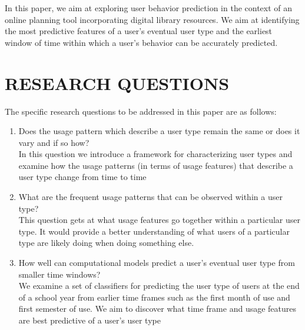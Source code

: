 \documentclass{acm_proc_article-sp}
\begin{document}
In this paper, we aim at exploring user behavior prediction in the context of an online planning tool incorporating digital library resources. We aim at identifying the most predictive features of a user's eventual user type and the earliest window of time within which a user's behavior can be accurately predicted.

\section{RESEARCH QUESTIONS}
The specific research questions to be addressed in this paper are as follows:
\begin{enumerate}
\item Does the usage pattern which describe a user type remain the same or does it vary and if so how?
\\In this question we introduce a framework for characterizing user types and examine how the usage patterns (in terms of usage features) that describe a user type change from time to time
\item What are the frequent usage patterns that can be observed within a user type?
\\This question gets at what usage features go together within a particular user type. It would provide a better understanding of what users of a particular type are likely doing when doing something else.
\item How well can computational models predict a user's eventual user type from smaller time windows?
\\We examine a set of classifiers for predicting the user type of users at the end of a school year from earlier time frames such as
the first month of use and first semester of use. We aim to discover what time frame and usage features are best predictive of a user's user type
\end{enumerate}
\end{document}
